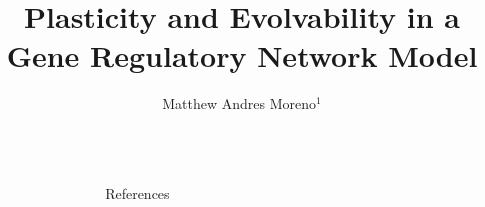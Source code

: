 \documentclass[final,table]{beamer}
\title{Plasticity and Evolvability in a Gene Regulatory Network Model} %
\author{Matthew Andres Moreno$^{1}$} %
\institute{$^{1}$Michigan State University}%
\newlength{\sepwid}
\newlength{\onecolwid}
\newlength{\twocolwid}
\begin{document}

\setlength{\belowcaptionskip}{0ex} %
\setlength\belowdisplayshortskip{2ex} %

\begin{frame}[t] %
\vspace{-1ex}
\begin{columns}[t] %

\begin{column}{\sepwid}\end{column} %

\begin{column}{\onecolwid} %



\begin{block}{References}
{\tiny
}
\end{block}








\end{column} %

\begin{column}{\sepwid}\end{column} %

\begin{column}{\twocolwid} %


\end{column}
\end{columns}
\end{frame}
\end{document}
